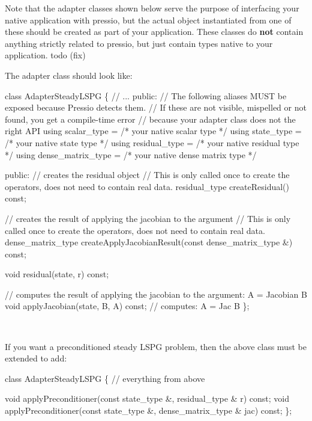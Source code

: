 Note that the adapter classes shown below serve the purpose of interfacing your native application with pressio, but the actual object instantiated from one of these should be created as part of your application. These classes do {\bfseries not} contain anything strictly related to pressio, but just contain types native to your application. todo (fix)

The adapter class should look like\+:

 
\begin{DoxyCode}
\textcolor{keyword}{class }AdapterSteadyLSPG
\{
  \textcolor{comment}{// ...}
\textcolor{keyword}{public}:
  \textcolor{comment}{// The following aliases MUST be exposed because Pressio detects them.}
  \textcolor{comment}{// If these are not visible, mispelled or not found, you get a compile-time error}
  \textcolor{comment}{// because your adapter class does not the right API}
  \textcolor{keyword}{using} scalar\_type       = \textcolor{comment}{/* your native scalar type */}
  \textcolor{keyword}{using} state\_type        = \textcolor{comment}{/* your native state type */}
  \textcolor{keyword}{using} residual\_type     = \textcolor{comment}{/* your native residual type */}
  \textcolor{keyword}{using} dense\_matrix\_type = \textcolor{comment}{/* your native dense matrix type */}

\textcolor{keyword}{public}:
  \textcolor{comment}{// creates the residual object}
  \textcolor{comment}{// This is only called once to create the operators, does not need to contain real data.}
  residual\_type createResidual() \textcolor{keyword}{const};

  \textcolor{comment}{// creates the result of applying the jacobian to the argument}
  \textcolor{comment}{// This is only called once to create the operators, does not need to contain real data.}
  dense\_matrix\_type createApplyJacobianResult(\textcolor{keyword}{const} dense\_matrix\_type &) \textcolor{keyword}{const};

  \textcolor{keywordtype}{void} residual(state, r) \textcolor{keyword}{const};

  \textcolor{comment}{// computes the result of applying the jacobian to the argument: A  = Jacobian B}
  \textcolor{keywordtype}{void} applyJacobian(state, B, A) \textcolor{keyword}{const}; \textcolor{comment}{// computes: A = Jac B}
\};
\end{DoxyCode}
 

~\newline
 

If you want a preconditioned steady L\+S\+PG problem, then the above class must be extended to add\+:  
\begin{DoxyCode}
\textcolor{keyword}{class }AdapterSteadyLSPG
\{
  \textcolor{comment}{// everything from above}

  \textcolor{keywordtype}{void} applyPreconditioner(\textcolor{keyword}{const} state\_type &, residual\_type & r) \textcolor{keyword}{const};
  \textcolor{keywordtype}{void} applyPreconditioner(\textcolor{keyword}{const} state\_type &, dense\_matrix\_type & jac) \textcolor{keyword}{const};
\};
\end{DoxyCode}
 